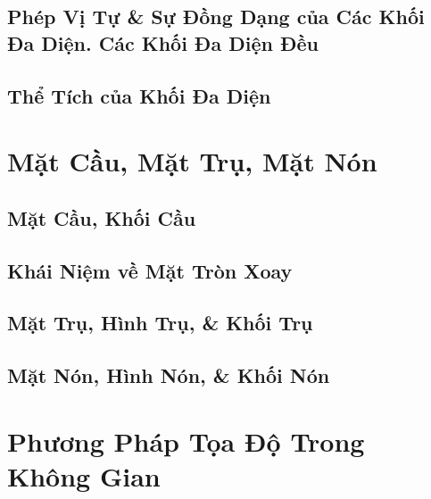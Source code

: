 \documentclass[oneside]{book}
\numberwithin{equation}{section}
\begin{document}
\section{Phép Vị Tự \& Sự Đồng Dạng của Các Khối Đa Diện. Các Khối Đa Diện Đều}


\section{Thể Tích của Khối Đa Diện}


\chapter{Mặt Cầu, Mặt Trụ, Mặt Nón}

\section{Mặt Cầu, Khối Cầu}


\section{Khái Niệm về Mặt Tròn Xoay}


\section{Mặt Trụ, Hình Trụ, \& Khối Trụ}


\section{Mặt Nón, Hình Nón, \& Khối Nón}


\chapter{Phương Pháp Tọa Độ Trong Không Gian}
\end{document}
